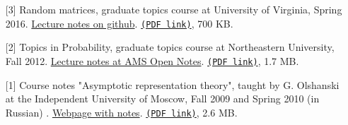\begin{enumerate}
\item[{[3]}]
Random matrices, graduate topics course at University of Virginia, Spring 2016. \href{https://github.com/lenis2000/RMT_Spring_2016/blob/master/Random_Matrices_Notes.pdf}{Lecture notes on github}. \href{https://storage.lpetrov.cc/papers/lec03-Random_Matrices_Notes.pdf}{\texttt{(PDF link)}}, 700 KB.





















































\item[{[2]}]
Topics in Probability, graduate topics course at Northeastern University, Fall 2012. \href{https://www.ams.org/open-math-notes/omn-view-listing?listingId=110813}{Lecture notes at AMS Open Notes}. \href{https://storage.lpetrov.cc/papers/lec02-OMN-202001-110813-1-Course_notes-v1.pdf}{\texttt{(PDF link)}}, 1.7 MB.















\item[{[1]}]
Course notes "Asymptotic representation theory", taught by G. Olshanski at the Independent University of Moscow, Fall 2009 and Spring 2010 (in Russian)
. \href{https://lpetrov.cc/art/}{Webpage with notes}. \href{https://storage.lpetrov.cc/papers/lec01-Olshanski_ART_course.pdf}{\texttt{(PDF link)}}, 2.6 MB.




























\end{enumerate}


